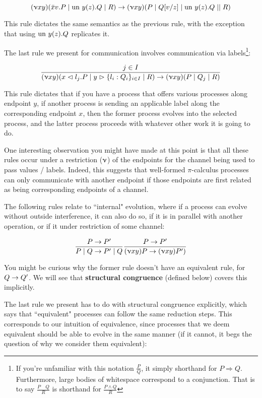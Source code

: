 $$(\upnu xy)(\bar{x}v.P \mid \text{un } y(z).Q \mid R) \rightarrow (\upnu xy)(P \mid Q[v/z]\mid \text{un } y(z).Q \mid \mid R)$$

This rule dictates the same semantics as the previous rule, with the exception that using $\text{un } y(z).Q$ replicates it.

The last rule we present for communication involves communication via labels\footnote{If you're unfamiliar with this notation $\frac{P}{Q}$, it simply shorthand for $P \Rightarrow Q$. Furthermore, large bodies of whitespace correspond to a conjunction. That is to say $\frac{P \quad Q}{R}$ is shorthand for $\frac{P \land Q}{R}$}:

$$\frac{j \in I}{(\upnu xy)(x \vartriangleleft l_j . P \mid y \vartriangleright \{l_i : Q_i\}_{i \in I} \mid R) \rightarrow (\upnu xy)(P \mid Q_j \mid R)}$$

This rule dictates that if you have a process that offers various processes along endpoint $y$, if another process is sending an applicable label along the corresponding endpoint $x$, then the former process evolves into the selected process, and the latter process proceeds with whatever other work it is going to do.

One interesting observation you might have made at this point is that all these rules occur under a restriction ($\upnu$) of the endpoints for the channel being used to pass values / labels. Indeed, this suggests that well-formed $\pi$-calculus processes can only communicate with another endpoint if those endpoints are first related as being corresponding endpoints of a channel.

The following rules relate to ``internal" evolution, where if a process can evolve without outside interference, it can also do so, if it is in parallel with another operation, or if it under restriction of some channel:

$$
\frac{P \rightarrow P'}{P \mid Q \rightarrow P' \mid Q} \\
\frac{P \rightarrow P'}{(\upnu xy)P \rightarrow (\upnu xy) P')}
$$

You might be curious why the former rule doesn't have an equivalent rule, for $Q \rightarrow Q'$. We will see that \textbf{structural congruence} (defined below) covers this implicitly.

The last rule we present has to do with structural congruence explicitly, which says that ``equivalent" processes can follow the same reduction steps. This corresponds to our intuition of equivalence, since processes that we deem equivalent should be able to evolve in the same manner (if it cannot, it begs the question of why we consider them equivalent):

